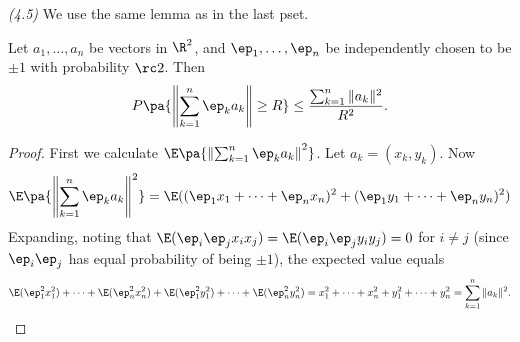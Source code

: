 \begin{problem}{\it (4.5)}
We use the same lemma as in the last pset.
\begin{lem}\label{p4-2-l1}
Let $a_1,\ldots, a_n$ be vectors in $\R^2$, and $\ep_1,\ldots, \ep_n$ be independently chosen to be $\pm 1$ with probability $\rc2$. Then
\[
P\pa{\left\Vert\sum_{k=1}^n \ep_ka_k\right\Vert\ge R}\le\frac{\sum_{k=1}^n \Vert a_k\Vert^2}{R^2}. 
\]
\end{lem}
\begin{proof}
First we calculate $\E\pa{\left\Vert\sum_{k=1}^n \ep_ka_k\right\Vert^2}$. Let $a_k=(x_k,y_k)$. Now
\[
\E\pa{\left\Vert\sum_{k=1}^n \ep_ka_k\right\Vert^2} =\E((\ep_1x_1+\cdots +\ep_nx_n)^2+(\ep_1y_1+\cdots +\ep_ny_n)^2)\]
Expanding, noting that $\E(\ep_i\ep_jx_ix_j)=\E(\ep_i\ep_jy_iy_j)=0$ for $i\ne j$ (since $\ep_i\ep_j$ has equal probability of being $\pm1$), the expected value equals
\[
\E(\ep_1^2x_1^2)+\cdots +\E(\ep_n^2 x_n^2)+\E(\ep_1^2 y_1^2)+\cdots +\E(\ep_n^2y_n^2)=x_1^2+\cdots +x_n^2+y_1^2+\cdots +y_n^2=\sum_{k=1}^n \Vert a_k\Vert^2.
\]


\end{proof}
\end{problem}

